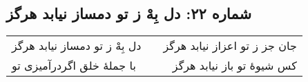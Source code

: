 \begin{center}
\section*{شماره ۲۲: دل بِهْ ز تو دمساز نیابد هرگز}
\label{sec:022}
\begin{longtable}{l p{0.5cm} r}
دل بِهْ ز تو دمساز نیابد هرگز
&&
جان جز ز تو اعزاز نیابد هرگز
\\
با جملهٔ خلق اگردرآمیزی تو
&&
کس شیوهٔ تو باز نیابد هرگز
\\
\end{longtable}
\end{center}
